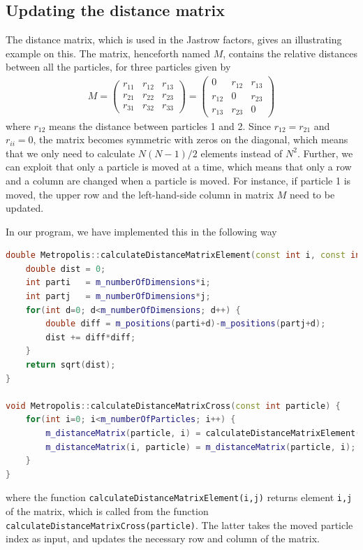 \subsection{Updating the distance matrix} \label{sec:distancematrix}
The distance matrix, which is used in the Jastrow factors, gives an illustrating example on this. The matrix, henceforth named $M$, contains the relative distances between all the particles, for three particles given by
\begin{eqnarray}
M=
\begin{pmatrix}
r_{11} & r_{12} & r_{13} \\
r_{21} & r_{22} & r_{23} \\
r_{31} & r_{32} & r_{33}
\end{pmatrix}
=
\begin{pmatrix}
0 & r_{12} & r_{13} \\
r_{12} & 0 & r_{23} \\
r_{13} & r_{23} & 0
\end{pmatrix}
\end{eqnarray}
where $r_{12}$ means the distance between particles 1 and 2. Since $r_{12}=r_{21}$ and $r_{ii}=0$, the matrix becomes symmetric with zeros on the diagonal, which means that we only need to calculate $N(N-1)/2$ elements instead of $N^2$. Further, we can exploit that only a particle is moved at a time, which means that only a row and a column are changed when a particle is moved. For instance, if particle 1 is moved, the upper row and the left-hand-side column in matrix $M$ need to be updated. 

In our program, we have implemented this in the following way
\lstset{basicstyle=\scriptsize}
\begin{lstlisting}[language=c++,caption={When a particle is moved, we update a row and a column in the distance matrix. The functions are parts of the Metropolis class, as the distance matrix is updated for every step in the Metropolis sampling. Taken from \texttt{metropolis.cpp}.}]
double Metropolis::calculateDistanceMatrixElement(const int i, const int j) {
	double dist = 0;
	int parti   = m_numberOfDimensions*i;
	int partj   = m_numberOfDimensions*j;
	for(int d=0; d<m_numberOfDimensions; d++) {
		double diff = m_positions(parti+d)-m_positions(partj+d);
		dist += diff*diff;
	}
	return sqrt(dist);
}

void Metropolis::calculateDistanceMatrixCross(const int particle) {
	for(int i=0; i<m_numberOfParticles; i++) {
		m_distanceMatrix(particle, i) = calculateDistanceMatrixElement(particle, i);
		m_distanceMatrix(i, particle) = m_distanceMatrix(particle, i);
	}
}

\end{lstlisting}
where the function \texttt{calculateDistanceMatrixElement(i,j)} returns element \texttt{i,j} of the matrix, which is called from the function \texttt{calculateDistanceMatrixCross(particle)}. The latter takes the moved particle index as input, and updates the necessary row and column of the matrix. 

